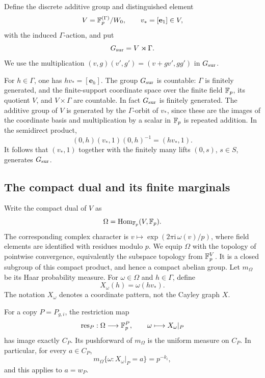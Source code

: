 \begin{definition}
Define the discrete additive group and distinguished element
\[
  V=\mathbb F_p^{(\Gamma)}/W_0,\qquad v_*=[\mathbf e_1]\in V,
\]
with the induced \(\Gamma\)-action, and put
\[
  G_{\mathrm{sur}}=V\rtimes\Gamma.
\]
We use the multiplication
\((v,g)(v',g')=(v+gv',gg')\) in \(G_{\mathrm{sur}}\).
\end{definition}

For \(h\in\Gamma\), one has \(hv_*=[\mathbf e_h]\).
The group \(G_{\mathrm{sur}}\) is countable: \(\Gamma\) is finitely generated, and the
finite-support coordinate space over the finite field \(\mathbb F_p\), its
quotient \(V\), and \(V\times\Gamma\) are countable.
In fact \(G_{\mathrm{sur}}\) is finitely generated.  The additive group of \(V\) is
generated by the \(\Gamma\)-orbit of \(v_*\), since these are the images
of the coordinate basis and multiplication by a scalar in \(\mathbb F_p\)
is repeated addition.  In the semidirect product,
\[
  (0,h)(v_*,1)(0,h)^{-1}=(hv_*,1).
\]
It follows that \((v_*,1)\) together with the finitely many lifts
\((0,s)\), \(s\in S\), generates \(G_{\mathrm{sur}}\).

\subsection{The compact dual and its finite marginals}

Write the compact dual of \(V\) as
\[
  \Omega=\operatorname{Hom}_{\mathbb F_p}(V,\mathbb F_p).
\]
The corresponding complex character is
\(v\mapsto \exp(2\pi\mathrm i\,\omega(v)/p)\), where field elements
are identified with residues modulo \(p\).
We equip \(\Omega\) with the topology of pointwise convergence,
equivalently the subspace topology from \(\mathbb F_p^V\).
It is a closed subgroup of this compact product, and hence a compact
abelian group.  Let \(m_\Omega\) be its Haar probability measure.
For \(\omega\in\Omega\) and \(h\in\Gamma\), define
\[
  X_\omega(h)=\omega(hv_*).
\]
The notation \(X_\omega\) denotes a coordinate pattern, not the
Cayley graph \(X\).

\begin{lemma}
\label{lem:marginals}
For a copy \(P=P_{g,i}\), the restriction map
\[
  \operatorname{res}_P:\Omega\longrightarrow\mathbb F_p^P,
  \qquad \omega\longmapsto X_\omega|_P
\]
has image exactly \(C_P\).  Its pushforward of \(m_\Omega\) is the
uniform measure on \(C_P\).  In particular, for every \(a\in C_P\),
\begin{equation}
\label{eq:uniform-marginal}
  m_\Omega\{\omega:X_\omega|_P=a\}=p^{-k_i},
\end{equation}
and this applies to \(a=w_P\).
\end{lemma}

